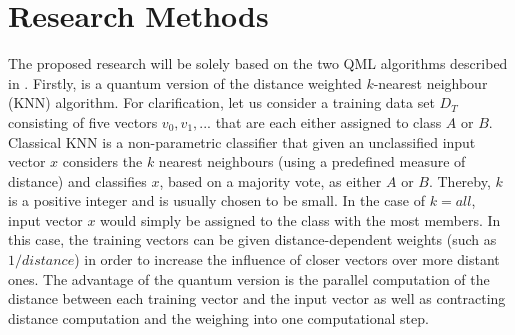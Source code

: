 \documentclass[a4paper]{article}
\newcommand*{\0}{$\ket{0}$}
\newcommand*{\1}{$\ket{1}$}
\begin{document}

\newpage
		
\section{Research Methods}
\label{sec:researchmethods}



The proposed research will be solely based on the two QML algorithms described in \cite{Schuld2014, Schuld2016}. Firstly, \cite{Schuld2014} is a quantum version of the distance weighted $k$-nearest neighbour (KNN) algorithm. For clarification, let us consider a training data set ${D}_{T}$ consisting of five vectors ${v}_{0}, {v}_{1},...$ that are each either assigned to class $A$ or $B$. Classical KNN is a non-parametric classifier that given an unclassified input vector $x$ considers the $k$ nearest neighbours (using a predefined measure of distance) and classifies $x$, based on a majority vote, as either $A$ or $B$. Thereby, $k$ is a positive integer and is usually chosen to be small. In the case of $k = all$, input vector $x$ would simply be assigned to the class with the most members. In this case, the training vectors can be given distance-dependent weights (such as $1/distance$) in order to increase the influence of closer vectors over more distant ones. The advantage of the quantum version is the parallel computation of the distance between each training vector and the input vector as well as contracting distance computation and the weighing into one computational step.
\end{document}
